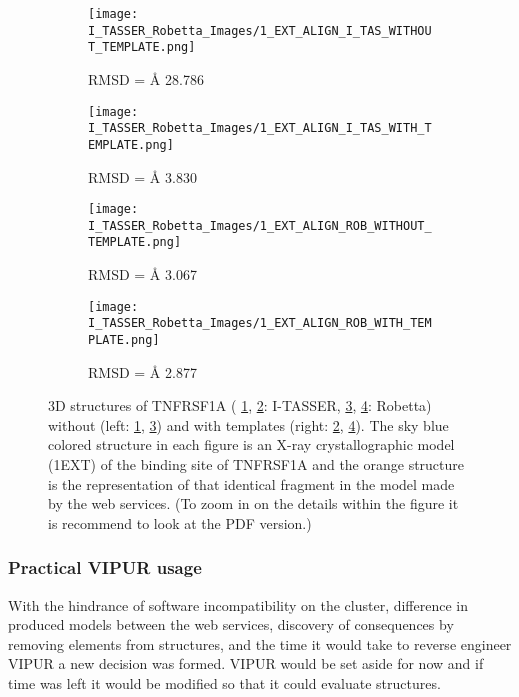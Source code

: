 	\begin{figure}[!ht]
		\centering
		\begin{subfigure}{0.49\textwidth}
			\texttt{[image: I\_TASSER\_Robetta\_Images/1\_EXT\_ALIGN\_I\_TAS\_WITHOUT\_TEMPLATE.png]}
			\caption{RMSD = {\AA} 28.786}
			\label{fig:RES_I_TASSER_Without}
		\end{subfigure}
		\begin{subfigure}{0.49\textwidth}
			\texttt{[image: I\_TASSER\_Robetta\_Images/1\_EXT\_ALIGN\_I\_TAS\_WITH\_TEMPLATE.png]}
			\caption{RMSD = {\AA} 3.830}
			\label{fig:RES_I_TASSER_With}
		\end{subfigure}
		\par\bigskip
		\begin{subfigure}{0.49\textwidth}
			\texttt{[image: I\_TASSER\_Robetta\_Images/1\_EXT\_ALIGN\_ROB\_WITHOUT\_TEMPLATE.png]}
			\caption{RMSD =  {\AA} 3.067}
			\label{fig:RES_Robetta_Without}
		\end{subfigure}
		\begin{subfigure}{0.49\textwidth}
			\texttt{[image: I\_TASSER\_Robetta\_Images/1\_EXT\_ALIGN\_ROB\_WITH\_TEMPLATE.png]}
			\caption{RMSD =  {\AA} 2.877}
			\label{fig:RES_Robetta_With}
		\end{subfigure}
		\caption[I-TASSER and Robetta models with and without templates]{3D structures of TNFRSF1A ( \ref{fig:RES_I_TASSER_Without}, \ref{fig:RES_I_TASSER_With}: I-TASSER, \ref{fig:RES_Robetta_Without}, \ref{fig:RES_Robetta_With}: Robetta) without (left: \ref{fig:RES_I_TASSER_Without}, \ref{fig:RES_Robetta_Without}) and with templates (right: \ref{fig:RES_I_TASSER_With}, \ref{fig:RES_Robetta_With}). The sky blue colored structure in each figure is an X-ray crystallographic model (1EXT) of the binding site of TNFRSF1A and the orange structure is the representation of that identical fragment in the model made by the web services. (To zoom in on the details within the figure it is recommend to look at the PDF version.)}
		\label{fig:I_Tasser_Robetta_models}
	\end{figure}
	\label{subsubsec:RES_Expanding_Models}
	
	\subsubsection{Practical VIPUR usage}
	With the hindrance of software incompatibility on the cluster, difference in produced models between the web services, discovery of consequences by removing elements from structures, and the time it would take to reverse engineer VIPUR a new decision was formed. 
	VIPUR would be set aside for now and if time was left it would be modified so that it could evaluate structures.

